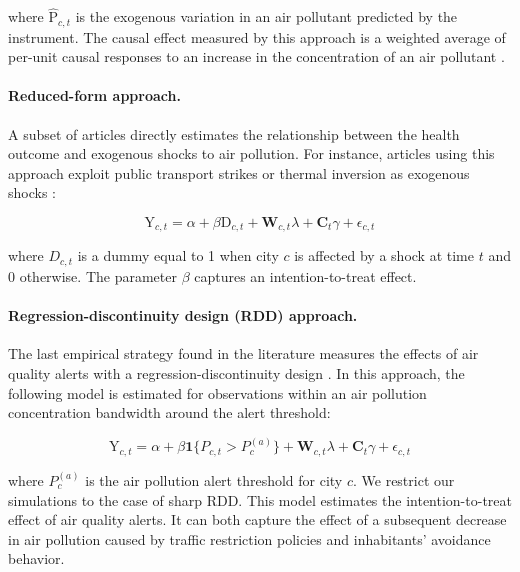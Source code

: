 \documentclass[12pt]{article}
\begin{document}
        \noindent where $\widehat{\text{P}}_{c,t}$ is the exogenous variation in an air pollutant predicted by the instrument. The causal effect measured by this approach is a weighted average of per-unit causal responses to an increase in the concentration of an air pollutant \citep{angrist_two-stage_1995}.

        \paragraph{Reduced-form approach.} A subset of articles directly estimates the relationship between the health outcome and exogenous shocks to air pollution. For instance, articles using this approach exploit public transport strikes or thermal inversion as exogenous shocks \citep{bauernschuster_when_2017, jans_economic_2018, godzinski2019short, giaccherini_when_2021}:
    
        \begin{equation*}
        \text{Y}_{c,t} = \alpha + \beta\text{D}_{c,t} + \textbf{W}_{c,t}\lambda + \textbf{C}_{t}\gamma + \epsilon_{c,t}
        \end{equation*}
        
        \noindent where $D_{c,t}$ is a dummy equal to 1 when city $c$ is affected by a shock at time $t$ and 0 otherwise. The parameter $\beta$ captures an intention-to-treat effect.
        
        \paragraph{Regression-discontinuity design (RDD) approach.} The last empirical strategy found in the literature measures the effects of air quality alerts with a regression-discontinuity design \citep{chen_effect_2018, anderson2022bounds}. In this approach, the following model is estimated for observations within an air pollution concentration bandwidth around the alert threshold:
        
        \begin{equation*}
        \text{Y}_{c,t} = \alpha + \beta \textbf{1}\{P_{c,t} > P^{(a)}_{c}\} + \textbf{W}_{c,t}\lambda + \textbf{C}_{t}\gamma + \epsilon_{c,t}
        \end{equation*}
        
        \noindent where $P^{(a)}_{c}$ is the air pollution alert threshold for city $c$. We restrict our simulations to the case of sharp RDD. This model estimates the intention-to-treat effect of air quality alerts.  It can both capture the effect of a subsequent decrease in air pollution caused by traffic restriction policies and inhabitants' avoidance behavior. 
        
\end{document}
